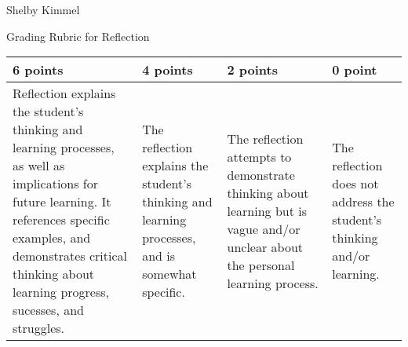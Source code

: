 \documentclass[12pt,landscape]{article}
\begin{document}
\hfill Shelby Kimmel

\begin{center}
{\huge Grading Rubric for Reflection}
\end{center}



{\renewcommand{\arraystretch}{2}
\begin{tabular}{|p{5cm}|p{5cm}|p{5cm}|p{5cm}|}
\hline
 {\bf 6 points} & {\bf 4 points} & {\bf 2 points} & {\bf 0 point} \\
\hline

Reflection explains the student's thinking and learning processes, as well as implications for future learning. It references specific examples, and demonstrates critical thinking about learning progress, sucesses, and struggles.& 
The reflection explains the student's thinking and learning processes, and is somewhat specific.&
The reflection attempts to demonstrate thinking about learning but is vague and/or unclear about the personal learning process.&
The reflection does not address the student's thinking and/or learning.\\
\hline
 \end{tabular}
}
\end{document}
